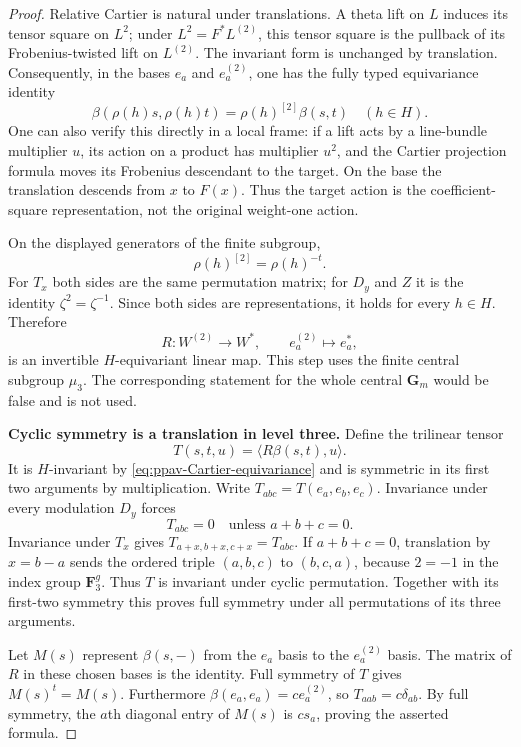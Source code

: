 \begin{proof}
Relative Cartier is natural under translations. A theta lift on $L$
induces its tensor square on $L^2$; under $L^2=F^*L^{(2)}$, this
tensor square is the pullback of its Frobenius-twisted lift on
$L^{(2)}$. The invariant form is unchanged by translation.
Consequently, in the bases $e_a$ and $e_a^{(2)}$, one has the
fully typed equivariance identity
\begin{equation}\label{eq:ppav-Cartier-equivariance}
 \beta(\rho(h)s,\rho(h)t)=\rho(h)^{[2]}\beta(s,t)
                         \quad(h\in H).
\end{equation}
One can also verify this directly in a local frame: if a lift acts
by a line-bundle multiplier $u$, its action on a product has multiplier
$u^2$, and the Cartier projection formula moves its Frobenius
descendant to the target. On the base the translation descends from
$x$ to $F(x)$. Thus the target action is the coefficient-square
representation, not the original weight-one action.

On the displayed generators of the finite subgroup,
\[
                \rho(h)^{[2]}=\rho(h)^{-t}.
\]
For $T_x$ both sides are the same permutation matrix; for $D_y$ and
$Z$ it is the identity $\zeta^2=\zeta^{-1}$. Since both sides are
representations, it holds for every $h\in H$.
Therefore
\[
 R:W^{(2)}\longrightarrow W^*,\qquad e_a^{(2)}\longmapsto e_a^*,
\]
is an invertible $H$-equivariant linear map. This step uses the finite
central subgroup $\mu_3$. The corresponding statement for the whole
central $\mathbf G_m$ would be false and is not used.

\par\smallskip\noindent\textbf{Cyclic symmetry is a translation in level three.}
Define the trilinear tensor
\[
                  T(s,t,u)=\langle R\beta(s,t),u\rangle.
\]
It is $H$-invariant by \eqref{eq:ppav-Cartier-equivariance} and is
symmetric in its first two arguments by multiplication.
Write $T_{abc}=T(e_a,e_b,e_c)$. Invariance under every modulation
$D_y$ forces
\[
            T_{abc}=0\quad\text{unless }a+b+c=0.
\]
Invariance under $T_x$ gives
$T_{a+x,b+x,c+x}=T_{abc}$.
If $a+b+c=0$, translation by $x=b-a$ sends the ordered triple
$(a,b,c)$ to $(b,c,a)$, because $2=-1$ in the index group
$\mathbf F_3^g$. Thus $T$ is invariant under cyclic permutation.
Together with its first-two symmetry this proves full symmetry
under all permutations of its three arguments.

Let $M(s)$ represent $\beta(s,-)$ from the $e_a$ basis to the
$e_a^{(2)}$ basis. The matrix of $R$ in these chosen bases is the
identity. Full symmetry of $T$ gives $M(s)^t=M(s)$.
Furthermore $\beta(e_a,e_a)=c e_a^{(2)}$, so
$T_{aab}=c\delta_{ab}$. By full symmetry, the $a$th diagonal
entry of $M(s)$ is $c s_a$, proving the asserted formula.


\end{proof}
